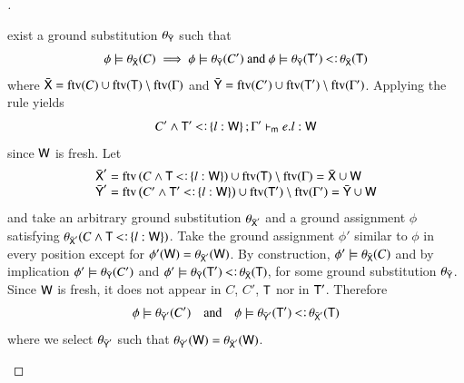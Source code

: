 \documentclass{report}
\begin{document}
\begin{proof}[]
\begin{indcase}{\sdsel}
      exist a ground substitution $\theta_{\bar{\textsf{Y}}}$ such that
      \begin{displaymath}
        \phi\csat\theta_{\bar{\type{X}}}(C) \implies \phi\csat \theta_{\bar{\type{Y}}}(C')\textrm{ and }\phi\csat \theta_{\bar{\type{Y}}}(\type{T}')\subtype\theta_{\bar{\type{X}}}(\type{T})
      \end{displaymath}
      where $\bar{\textsf{X}}=\mathop{\rm ftv}\nolimits(C)\cup\mathop{\rm ftv}\nolimits(\textsf{T})\setminus\mathop{\rm ftv}\nolimits(\Gamma)$ and
      $\bar{\textsf{Y}}=\mathop{\rm ftv}\nolimits(C')\cup\mathop{\rm ftv}\nolimits(\textsf{T}')\setminus\mathop{\rm ftv}\nolimits(\Gamma')$.
      Applying the \sdsel rule yields
      \begin{displaymath}
        C'\land\type{T}'\subtype\set{l:\type{W}};\Gamma'\entailsm e.l:\type{W}
      \end{displaymath}
      since $\textsf{W}$ is fresh.
      Let
      \begin{displaymath}
        \begin{array}{l}
          \bar{\type{X}}' =\ftv\lrp{C\land\type{T}\subtype\set{l:\type{W}}}\cup\ftv(\type{T})\setminus\ftv(\Gamma)=
            \bar{\type{X}}\cup\type{W} \\
          \bar{\type{Y}}' =\ftv\lrp{C'\land\type{T}'\subtype\set{l:\type{W}}}\cup\ftv(\type{T}')\setminus\ftv(\Gamma')=
            \bar{\type{Y}}\cup\type{W}
        \end{array}
      \end{displaymath}
      and take an arbitrary ground substitution $\theta_{\bar{\textsf{X}}'}$ and a ground assignment $\phi$
      satisfying $\theta_{\bar{\type{X}}'}(C\land\type{T}\subtype\set{l:\type{W}})$.
      Take the ground assignment
      $\phi'$ similar to $\phi$ in every position except for
      $\phi'(\textsf{W})=\theta_{\bar{\textsf{X}}'}(\textsf{W})$. By construction,
      $\phi'\models \theta_{\bar{\textsf{X}}}(C)$ and by implication
      $\phi'\models \theta_{\bar{\textsf{Y}}}(C')$ and
      $\phi'\csat \theta_{\bar{\type{Y}}}(\type{T}')\subtype\theta_{\bar{\type{X}}}(\type{T})$,
      for some ground substitution $\theta_{\bar{\textsf{Y}}}$.
      Since $\textsf{W}$ is fresh, it does not appear in $C$, $C'$, $\textsf{T}$ nor in $\textsf{T}'$.
      Therefore
      \begin{displaymath}
        \phi\csat \theta_{\bar{\type{Y}}'}(C') \quad\textrm{and}\quad
        \phi\csat \theta_{\bar{\type{Y}}'}(\type{T}')\subtype\theta_{\bar{\type{X}}'}(\type{T})
      \end{displaymath}
      where we select $\theta_{\bar{\textsf{Y}}'}$ such that
      $\theta_{\bar{\textsf{Y}}'}(\textsf{W})=\theta_{\bar{\textsf{X}}'}(\textsf{W})$.
      

\end{indcase}
\end{proof}
\end{document}
